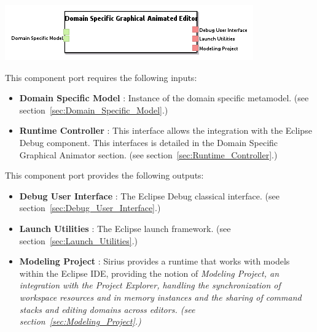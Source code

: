 \documentclass{gemoc} %
\begin{document}
\begin{center}
\includegraphics*[trim=0.0cm 0.0cm 0cm 0.0cm, clip=true]{../images/generated/Generated_Domain_Specific_Graphical_Animated_Editor.png}
\end{center}

This component port requires the following inputs:
\begin{itemize}
  \item \textbf{Domain Specific Model} :
Instance of the domain specific metamodel.
(see section~\ref{sec:Domain_Specific_Model}.)
  \item \textbf{Runtime Controller} :
This interface allows the integration with the Eclipse Debug component. This interfaces is detailed in the Domain Specific Graphical Animator section.
(see section~\ref{sec:Runtime_Controller}.)
\end{itemize}

This component port provides the following outputs:
\begin{itemize}
  \item \textbf{Debug User Interface} :
The Eclipse Debug classical interface.
(see section~\ref{sec:Debug_User_Interface}.)
  \item \textbf{Launch Utilities} :
The Eclipse launch framework.
(see section~\ref{sec:Launch_Utilities}.)
  \item \textbf{Modeling Project} :
Sirius provides a runtime that works with models within the Eclipse IDE, providing the notion of \em{Modeling Project}, an integration with the Project Explorer, handling the synchronization of workspace resources and in memory instances and the sharing of command stacks and editing domains across editors.
(see section~\ref{sec:Modeling_Project}.)
\end{itemize}
\end{document}
